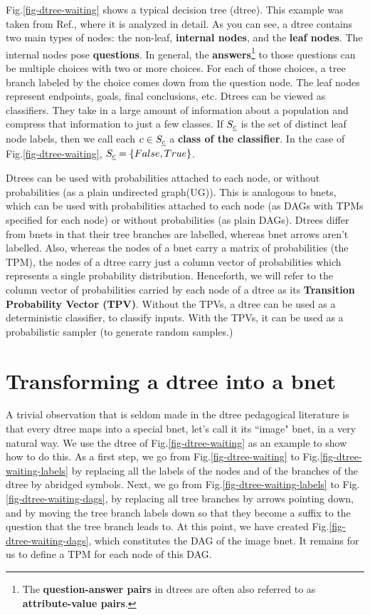 Fig.\ref{fig-dtree-waiting}
shows a typical decision tree (dtree).
This example was taken
from Ref.\cite{stu-nor-book},
where it is analyzed
in detail.
As you can see,
a dtree contains two main types
of nodes: the non-leaf, 
{\bf internal nodes},
and the {\bf leaf nodes}.
The internal nodes pose 
{\bf questions}. In general,
the {\bf answers}\footnote
{The {\bf question-answer pairs}
in dtrees are often
also referred to as 
{\bf attribute-value pairs}.}
 to those
questions can
be multiple choices with
two or more choices.
For each of those choices,
a tree branch labeled by the choice
 comes down from the 
question node.
The leaf nodes represent 
endpoints, goals, final
conclusions, etc.
Dtrees can be viewed
as classifiers. They
take in a large amount 
of information about a population 
and compress that information
to just a few classes.
If $S_{\underline{c}}$ is the 
set of distinct leaf node labels,
then we call each
$c\in S_{\underline{c}}$
a  {\bf class of the classifier}.
In the case of
Fig.\ref{fig-dtree-waiting},
$S_{\underline{c}}=\{False, True\}$.

Dtrees can be used 
with
probabilities attached to each node, or without
probabilities
(as a
plain undirected graph(UG)).
This is analogous to bnets,
which can be used with
probabilities attached to each node
 (as DAGs with
TPMs specified for each node) or without
probabilities (as plain
DAGs).
Dtrees differ 
from bnets in that
their tree branches 
are labelled, whereas bnet arrows
 aren't labelled.
Also,
whereas the nodes of
a bnet carry a matrix of 
probabilities (the TPM),
the nodes of a dtree carry
just a column vector
of probabilities
which represents
a single 
probability distribution.
Henceforth,
we will refer to
the column vector
of probabilities
carried by each node of a dtree
as its {\bf Transition
Probability Vector (TPV)}.
Without the TPVs,
a dtree can be used 
as a deterministic classifier,
to classify inputs.
With the TPVs,
it can be used as a 
probabilistic sampler (to generate
random samples.)

\section{Transforming a dtree into a bnet}
A trivial 
observation
that is seldom made
in the dtree pedagogical literature
is that every dtree 
maps into a special bnet, 
let's call it
its ``image" bnet,
in a very natural way.
We use the dtree
of Fig.\ref{fig-dtree-waiting}
as an example to show 
how to do this. As 
a first 
step,
we go from
Fig.\ref{fig-dtree-waiting}
to
Fig.\ref{fig-dtree-waiting-labels}
by
replacing
all the labels of the
nodes and of the branches of
the dtree 
by abridged symbols. 
Next, we go 
from Fig.\ref{fig-dtree-waiting-labels}
to Fig.\ref{fig-dtree-waiting-dags},
by replacing all tree branches 
by arrows pointing down,
 and by
moving the tree branch labels 
down so that they
become a suffix to the question 
that the tree branch leads to.
At this point,
we have created
Fig.\ref{fig-dtree-waiting-dags},
which constitutes
the DAG of the image bnet.
It remains for us to define
a TPM for each node
of this DAG.

